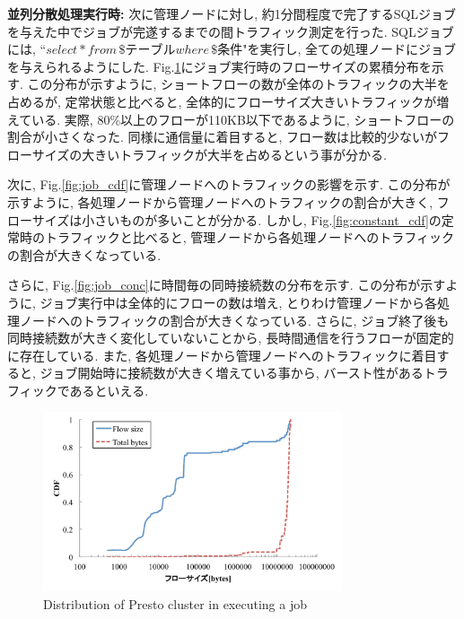 {\bf 並列分散処理実行時: }
次に管理ノードに対し, 約1分間程度で完了するSQLジョブを与えた中でジョブが完遂するまでの間トラフィック測定を行った.
SQLジョブには, ``$select * from \, \$テーブル where \, \$条件$"を実行し,
全ての処理ノードにジョブを与えられるようにした.
Fig.\ref{fig:job}にジョブ実行時のフローサイズの累積分布を示す.
この分布が示すように, ショートフローの数が全体のトラフィックの大半を占めるが, 定常状態と比べると,
全体的にフローサイズ大きいトラフィックが増えている.
実際, 80\%以上のフローが110KB以下であるように, ショートフローの割合が小さくなった.
同様に通信量に着目すると, フロー数は比較的少ないがフローサイズの大きいトラフィックが大半を占めるという事が分かる.

次に, Fig.\ref{fig:job_cdf}に管理ノードへのトラフィックの影響を示す.
この分布が示すように, 各処理ノードから管理ノードへのトラフィックの割合が大きく, フローサイズは小さいものが多いことが分かる.
しかし, Fig.\ref{fig:constant_cdf}の定常時のトラフィックと比べると,
管理ノードから各処理ノードへのトラフィックの割合が大きくなっている.

さらに, Fig.\ref{fig:job_conc}に時間毎の同時接続数の分布を示す.
この分布が示すように, ジョブ実行中は全体的にフローの数は増え, とりわけ管理ノードから各処理ノードへのトラフィックの割合が大きくなっている.
さらに, ジョブ終了後も同時接続数が大きく変化していないことから, 長時間通信を行うフローが固定的に存在している.
また, 各処理ノードから管理ノードへのトラフィックに着目すると, ジョブ開始時に接続数が大きく増えている事から, バースト性があるトラフィックであるといえる.

\begin{figure}[t]
    \begin{center}
    \includegraphics[autoebb, width=250pt]{./img/job.pdf}
    \caption{Distribution of Presto cluster in executing a job}
    \label{fig:job}
    \end{center}
\end{figure}

